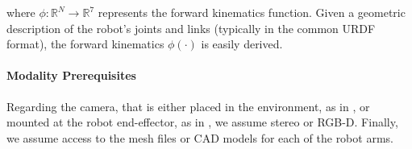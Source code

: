where $\phi: \mathbb{R}^N\rightarrow\mathbb{R}^{7}$ represents the forward kinematics function.
Given a geometric description of the robot's joints and links (typically in the common URDF format), the forward kinematics $\phi(\cdot)$ is easily derived.

\paragraph{Modality Prerequisites} Regarding the camera, that is either placed in the environment, as in , or mounted at the robot end-effector, as in , we assume stereo or RGB-D. Finally, we assume access to the mesh files or CAD models for each of the robot arms.






